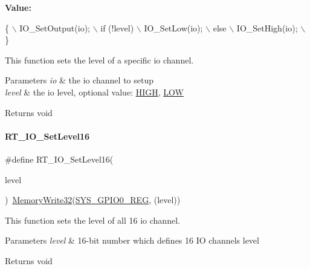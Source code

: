 {\bfseries Value\+:}
\begin{DoxyCode}
\{                       \(\backslash\)
        IO\_SetOutput(io);   \(\backslash\)
        if (!level)         \(\backslash\)
            IO\_SetLow(io);  \(\backslash\)
        else                \(\backslash\)
            IO\_SetHigh(io); \(\backslash\)
    \}
\end{DoxyCode}


This function sets the level of a specific io channel. 


\begin{DoxyParams}{Parameters}
{\em io} & the io channel to setup \\
\hline
{\em level} & the io level, optional value\+: \mbox{\hyperlink{a00014_a5bb885982ff66a2e0a0a45a8ee9c35e2}{H\+I\+GH}}, \mbox{\hyperlink{a00014_ab811d8c6ff3a505312d3276590444289}{L\+OW}} \\
\hline
\end{DoxyParams}
\begin{DoxyReturn}{Returns}
void 
\end{DoxyReturn}
\mbox{\label{a00014_a5a3ae496ca3e12098c74c9f13b20c554}} 
\paragraph{\texorpdfstring{R\+T\+\_\+\+I\+O\+\_\+\+Set\+Level16}{RT\_IO\_SetLevel16}}
{\footnotesize\ttfamily \#define R\+T\+\_\+\+I\+O\+\_\+\+Set\+Level16(\begin{DoxyParamCaption}\item[{}]{level }\end{DoxyParamCaption})~\mbox{\hyperlink{a00020_a6b9732365b12e48ddb89fe1028b975b0}{Memory\+Write32}}(\mbox{\hyperlink{a00020_ac12676fdbfbffb9d4114bb751b6d4f74}{S\+Y\+S\+\_\+\+G\+P\+I\+O0\+\_\+\+R\+EG}}, (level))}



This function sets the level of all 16 io channel. 


\begin{DoxyParams}{Parameters}
{\em level} & 16-\/bit number which defines 16 IO channels\textquotesingle{} level \\
\hline
\end{DoxyParams}
\begin{DoxyReturn}{Returns}
void 
\end{DoxyReturn}
\mbox{\label{a00014_ae0e5eb1313d8307cf1362e997ee6f25e}} 
